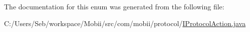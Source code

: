The documentation for this enum was generated from the following file\-:\begin{DoxyCompactItemize}
\item 
C\-:/\-Users/\-Seb/workspace/\-Mobii/src/com/mobii/protocol/\hyperlink{_i_protocol_action_8java}{I\-Protocol\-Action.\-java}\end{DoxyCompactItemize}
